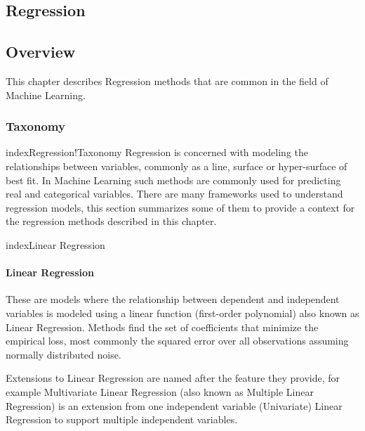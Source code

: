 

\renewcommand{\bibsection}{\subsection{\bibname}}
\begin{bibunit}

\chapter{Regression}
\label{ch:regression}

\section{Overview}
This chapter describes Regression methods that are common in the field of Machine Learning.

\subsection{Taxonomy}
index{Regression!Taxonomy}
Regression is concerned with modeling the relationships between variables, commonly as a line, surface or hyper-surface of best fit. In Machine Learning such methods are commonly used for predicting real and categorical variables. There are many frameworks used to understand regression models, this section summarizes some of them to provide a context for the regression methods described in this chapter.

index{Linear Regression}
\subsubsection{Linear Regression}
These are models where the relationship between dependent and independent variables is modeled using a linear function (first-order polynomial) also known as Linear Regression. Methods find the set of coefficients that minimize the empirical loss, most commonly the squared error over all observations assuming normally distributed noise.

Extensions to Linear Regression are named after the feature they provide, for example Multivariate Linear Regression (also known as Multiple Linear Regression) is an extension from one independent variable (Univariate) Linear Regression to support multiple independent variables.


\end{bibunit}
